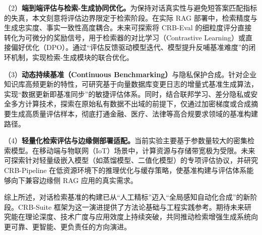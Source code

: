（2）\textbf{端到端评估与检索-生成协同优化。}为保持对话真实性与避免短答案匹配指标的失真，本文刻意将评估边界限定于检索阶段。在实际 RAG 部署中，检索精度与生成忠实度、事实一致性高度耦合。未来可探索将 CRB-Eval 的细粒度评分直接转化为可微分的奖励信号，用于检索器的对比学习（Contrastive Learning）或直接偏好优化（DPO）。通过“评估反馈驱动模型迭代、模型提升反哺基准难度”的闭环机制，实现检索-生成模块的联合优化。
    
（3）\textbf{动态持续基准（Continuous Benchmarking）}与隐私保护合成。针对企业知识库高频更新的特性，可研究基于向量数据库变更日志的增量式基准生成算法，实现“数据更新即基准同步”的敏捷评估体系。同时，结合联邦学习、差分隐私或安全多方计算技术，探索在原始私有数据不出域的前提下，仅通过加密梯度或合成摘要生成高质量评估样本，彻底打通金融、医疗、法律等高合规要求领域的基准构建路径。
    
（4）\textbf{轻量化检索评估与边缘侧部署适配。}当前实验主要基于参数量较大的密集检索模型。在移动端与物联网（IoT）场景中，计算资源与存储带宽极为受限。未来可探索针对轻量级嵌入模型（如蒸馏模型、二值化模型）的专项评估协议，并研究 CRB-Pipeline 在低资源环境下的推理优化与缓存策略，使基准构建与评估体系能够向下兼容边缘侧 RAG 应用的真实需求。


综上所述，对话检索基准的构建已从“人工精标”迈入“全局感知自动化合成”的新阶段。CRB-Suite 框架为这一演进提供了方法论基础与工程实践参考。期待未来研究能在理论深度、技术广度与应用效度上持续突破，共同推动检索增强生成系统向更可靠、更智能、更负责任的方向演进。